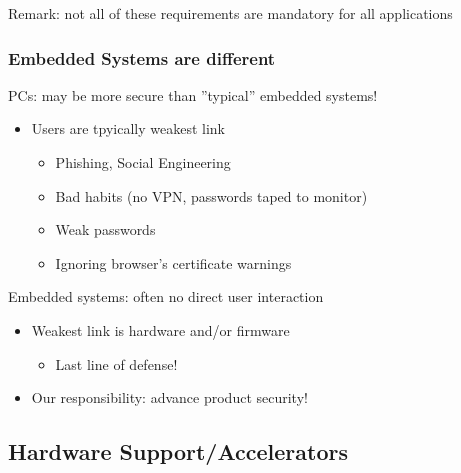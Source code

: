 Remark: not all of these requirements are mandatory for all applications

\subsubsection{Embedded Systems are different}
PCs: may be more secure than ''typical'' embedded systems!
\begin{itemize}
  \item Users are tpyically weakest link
        \begin{itemize}
          \item Phishing, Social Engineering
          \item Bad habits (no VPN, passwords taped to monitor)
          \item Weak passwords
          \item Ignoring browser's certificate warnings
        \end{itemize}
\end{itemize}
Embedded systems: often no direct user interaction
\begin{itemize}
  \item Weakest link is hardware and/or firmware
        \begin{itemize}
          \item Last line of defense!
        \end{itemize}
  \item Our responsibility: advance product security!
\end{itemize}

\subsection{Hardware Support/Accelerators}

